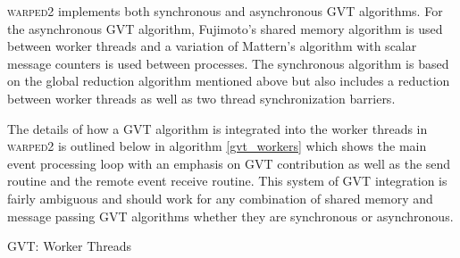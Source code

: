 \documentclass[11pt]{book}
\begin{document}
\textsc{warped2} implements both synchronous and asynchronous GVT algorithms. For the
asynchronous GVT algorithm, Fujimoto's shared memory algorithm is used between worker threads
and a variation of Mattern's algorithm with scalar message counters is used between processes.
The synchronous algorithm is based on the global reduction algorithm mentioned above but also
includes a reduction between worker threads as well as two thread synchronization barriers.

The details of how a GVT algorithm is integrated into the worker threads in \textsc{warped2}
is outlined below in algorithm \ref{gvt_workers} which shows the main event processing loop
with an emphasis on GVT contribution as well as the send routine and the remote event receive
routine. This system of GVT integration is fairly ambiguous and should work for any combination of
shared memory and message passing GVT algorithms whether they are synchronous or asynchronous.

\begin{algorithm}
\DontPrintSemicolon
{}

    \;

    \;


    \caption{GVT: Worker Threads}\label{gvt_workers}
\end{algorithm}
\end{document}
